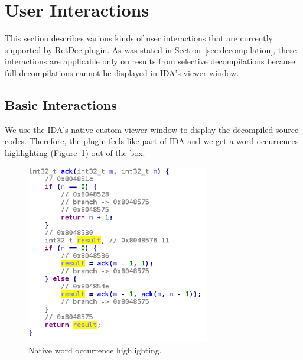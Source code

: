 \documentclass[pdftex, a4paper,12pt, oneside, svgnames]{article}
\begin{document}
\section{User Interactions}
\label{sec:user-interactions}
This section describes various kinds of user interactions that are currently supported by RetDec plugin. As was stated in Section~\ref{sec:decompilation}, these interactions are applicable only on results from selective decompilations because full decompilations cannot be displayed in IDA's viewer window.

\subsection{Basic Interactions}
We use the IDA's native custom viewer window to display the decompiled source codes. Therefore, the plugin feels like part of IDA and we get a word occurrences highlighting (Figure~\ref{fig:occurrence-highlighting}) out of the box.

\begin{figure}[!ht]
	\centering
	\includegraphics[width=8cm]{figures/occurrence-highlighting}
	\caption{Native word occurrence highlighting.}
	\label{fig:occurrence-highlighting}
\end{figure}
\end{document}
